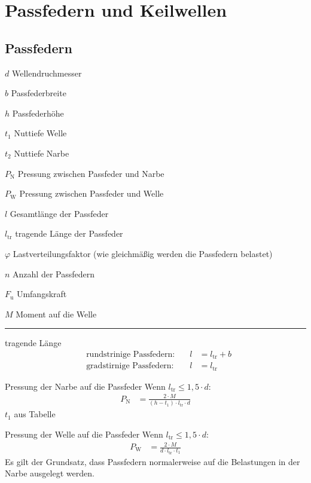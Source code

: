 \section{Passfedern und Keilwellen}
\subsection{Passfedern}
\begin{vardef}
	\item[$d$] Wellendruchmesser
	\item[$b$] Passfederbreite
	\item[$h$] Passfederhöhe
	\item[$t_1$] Nuttiefe Welle
	\item[$t_2$] Nuttiefe Narbe
	\item[$P_\text{N}$] Pressung zwischen Passfeder und Narbe
	\item[$P_\text{W}$] Pressung zwischen Passfeder und Welle
	\item[$l$] Gesamtlänge der Passfeder
	\item[$l_\text{tr}$] tragende Länge der Passfeder
	\item[$\varphi$] Lastverteilungsfaktor (wie gleichmäßig werden die Passfedern belastet)
	\item[$n$] Anzahl der Passfedern
	\item[$F_\text{u}$] Umfangskraft
	\item[$M$] Moment auf die Welle
\end{vardef}

\hrule
\begin{eeqn}{tragende Länge}
	\begin{align}
		&\text{rundstrinige Passfedern:}&\quad l &= l_\text{tr}+b \\
		&\text{gradstirnige Passfedern:}&\quad l &= l_\text{tr}
	\end{align}
\end{eeqn}	

\begin{eeqn}{Pressung der Narbe auf die Passfeder}
	Wenn $l_\text{tr} \leq 1,5 \cdot d$:
	\begin{align}
		P_\text{N} &= \frac{2\cdot M}{(h-t_1) \cdot l_\text{tr} \cdot d}
	\end{align}
	$t_1$ aus Tabelle
\end{eeqn}	

\begin{eeqn}{Pressung der Welle auf die Passfeder}
	Wenn $l_\text{tr} \leq 1,5 \cdot d$:
	\begin{align}
		P_\text{W} &= \frac{2\cdot M}{d\cdot l_\text{tr} \cdot t_1}
	\end{align}
	Es gilt der Grundsatz, dass Passfedern normalerweise auf die Belastungen in der Narbe ausgelegt werden. 
\end{eeqn}

